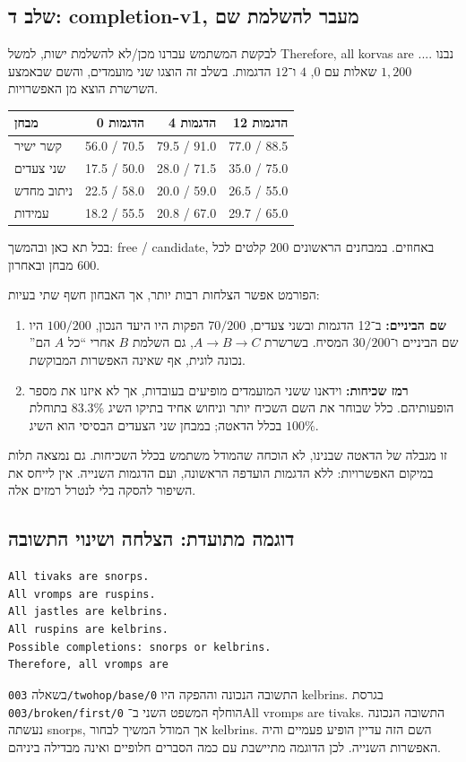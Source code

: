 \documentclass[11pt,a4paper]{article}
\newcommand{\en}[1]{\textenglish{#1}}
\newcommand{\file}[1]{\textenglish{\nolinkurl{#1}}}
\begin{document}
\subsection{שלב ד: completion-v1, מעבר להשלמת שם}
לבקשת המשתמש עברנו מכן/לא להשלמת ישות, למשל \en{Therefore, all korvas are ...}. נבנו $1{,}200$ שאלות עם $0$, $4$ ו־$12$ הדגמות. בשלב זה הוצגו שני מועמדים, והשם שבאמצע השרשרת הוצא מן האפשרויות.

\begin{center}\small
\begin{tabular}{lrrr}
\toprule
מבחן & 0 הדגמות & 4 הדגמות & 12 הדגמות\\
\midrule
קשר ישיר & \en{56.0 / 70.5} & \en{79.5 / 91.0} & \en{77.0 / 88.5}\\
שני צעדים & \en{17.5 / 50.0} & \en{28.0 / 71.5} & \en{35.0 / 75.0}\\
ניתוב מחדש & \en{22.5 / 58.0} & \en{20.0 / 59.0} & \en{26.5 / 55.0}\\
עמידות & \en{18.2 / 55.5} & \en{20.8 / 67.0} & \en{29.7 / 65.0}\\
\bottomrule
\end{tabular}
\end{center}
בכל תא כאן ובהמשך: \en{free / candidate}, באחוזים. במבחנים הראשונים $200$ קלטים לכל מבחן ובאחרון $600$.

הפורמט אפשר הצלחות רבות יותר, אך האבחון חשף שתי בעיות:
\begin{enumerate}
\item \textbf{שם הביניים:} ב־12 הדגמות ובשני צעדים, $70/200$ הפקות היו היעד הנכון, $100/200$ היו שם הביניים ו־$30/200$ המסיח. בשרשרת $A\to B\to C$, גם השלמת $B$ אחרי ``כל $A$ הם'' נכונה לוגית, אף שאינה האפשרות המבוקשת.
\item \textbf{רמז שכיחות:} וידאנו ששני המועמדים מופיעים בעובדות, אך לא איזנו את מספר הופעותיהם. כלל שבוחר את השם השכיח יותר וניחוש אחיד בתיקו השיג $83.3\%$ בתוחלת בכלל הדאטה; במבחן שני הצעדים הבסיסי הוא השיג $100\%$.
\end{enumerate}
זו מגבלה של הדאטה שבנינו, לא הוכחה שהמודל משתמש בכלל השכיחות. גם נמצאה תלות במיקום האפשרויות: ללא הדגמות הועדפה הראשונה, ועם הדגמות השנייה. אין לייחס את השיפור להסקה בלי לנטרל רמזים אלה.

\subsection{דוגמה מתועדת: הצלחה ושינוי התשובה}
\begin{english}\small
\begin{verbatim}
All tivaks are snorps.
All vromps are ruspins.
All jastles are kelbrins.
All ruspins are kelbrins.
Possible completions: snorps or kelbrins.
Therefore, all vromps are
\end{verbatim}
\end{english}
בשאלה \file{003/twohop/base/0} התשובה הנכונה וההפקה היו \en{kelbrins}. בגרסת \file{003/broken/first/0} הוחלף המשפט השני ב־\en{All vromps are tivaks}. התשובה הנכונה נעשתה \en{snorps}, אך המודל המשיך לבחור \en{kelbrins}. השם הזה עדיין הופיע פעמיים והיה האפשרות השנייה. לכן הדוגמה מתיישבת עם כמה הסברים חלופיים ואינה מבדילה ביניהם.
\end{document}
